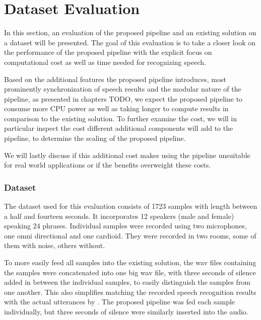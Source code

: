 

\section{Dataset Evaluation}
\label{eval:dataset}

In this section, an evaluation of the proposed pipeline and an existing solution on a dataset will be presented.
The goal of this evaluation is to take a closer look on the performance of the proposed pipeline with the explicit focus on computational cost as well as time needed for recognizing speech.

Based on the additional features the proposed pipeline introduces, most prominently synchronization of speech results and the modular nature of the pipeline, as presented in chapters TODO, we expect the proposed pipeline to consume more CPU power as well as taking longer to compute results in comparison to the existing solution.
To further examine the cost, we will in particular inspect the cost different additional components will add to the pipeline, to determine the scaling of the proposed pipeline.

We will lastly discuss if this additional cost makes using the pipeline unsuitable for real world applications or if the benefits overweight these costs.

\subsubsection{Dataset}
\label{eval:dataset:dataset}

The dataset used for this evaluation consists of 1723 samples with length between a half and fourteen seconds.
It incorporates 12 speakers (male and female) speaking 24 phrases. 
Individual samples were recorded using two microphones, one omni directional and one cardioid.
They were recorded in two rooms, some of them with noise, others without.

To more easily feed all samples into the existing solution, the wav files containing the samples were concatenated into one big wav file, with three seconds of silence added in between the individual samples, to easily distinguish the samples from one another.
This also simplifies matching the recorded speech recognition results with the actual utterances by .
The proposed pipeline was fed each sample individually, but three seconds of silence were similarly inserted into the audio.

